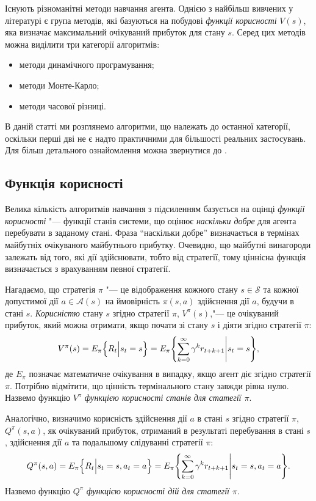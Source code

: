 \documentclass[a4paper,10pt]{article}
\begin{document}
Існують різноманітні методи навчання агента. Однією з найбільш вивчених у літературі є група методів, які базуються на побудові \emph{функції корисності} $V(s)$, яка визначає максимальний очікуваний прибуток для стану $s$. Серед цих методів можна виділити три категорії алгоритмів:

\begin{itemize}
\item методи динамічного програмування;
\item методи Монте-Карло;
\item методи часової різниці.
\end{itemize}

В даній статті ми розглянемо алгоритми, що належать до останної категорії, оскільки перші дві не є надто практичними для більшості реальних застосувань. Для більш детального ознайомлення можна звернутися до \cite{SuttonBarto02}.

\subsection{Функція корисності}

Велика кількість алгоритмів навчання з підсиленням базується на оцінці \emph{функції корисності} "--- функції станів системи, що оцінює \emph{наскільки добре} для агента перебувати в заданому стані. Фраза ``наскільки добре'' визначається в термінах майбутніх очікуваного майбутнього прибутку. Очевидно, що майбутні винагороди залежать від того, які дії здійснювати, тобто від стратегії, тому ціннісна функція визначається з врахуванням певної стратегії.

Нагадаємо, що стратегія $\pi$ "--- це відображення кожного стану $s \in \mathcal{S}$ та кожної допустимої дії $a \in \mathcal{A}(s)$ на ймовірність $\pi(s,a)$ здійснення дії $a$, будучи в стані $s$. \emph{Корисністю} стану $s$ згідно стратегії $\pi$, $V^\pi(s)$,"--- це очікуваний прибуток, який можна отримати, якщо почати зі стану $s$ і діяти згідно стратегії $\pi$:
\begin{equation}
V^\pi(s) = E_\pi \Bigl\{ R_t \Big| s_t = s \Bigr \} = E_\pi \Biggl\{\sum_{k=0}^{\infty}\gamma^k r_{t+k+1} \Bigg| s_t=s \Biggr\},
\end{equation}
де $E_\pi{}$ позначає математичне очікування в випадку, якщо агент діє згідно стратегії $\pi$. Потрібно відмітити, що цінність термінального стану завжди рівна нулю. Назвемо функцію $V^\pi$ \emph{функцією корисності станів для статегії $\pi$}.

Аналогічно, визначимо корисність здійснення дії $a$ в стані $s$ згідно стратегії $\pi$, $Q^\pi(s,a)$, як очікуваний прибуток, отриманий в результаті перебування в стані $s$, здійснення дії $a$ та подальшому слідуванні стратегії $\pi$:
\begin{equation}
Q^\pi(s,a)=E_\pi \Bigl\{ R_t \Big| s_t=s, a_t=a \Bigr\} = E_\pi \Biggl\{\sum_{k=0}^{\infty}\gamma^k r_{t+k+1} \Bigg| s_t=s,a_t=a \Biggr\}.
\end{equation}
Назвемо функцію $Q^\pi$ \emph{функцією корисності дій для статегії $\pi$}.
\end{document}
